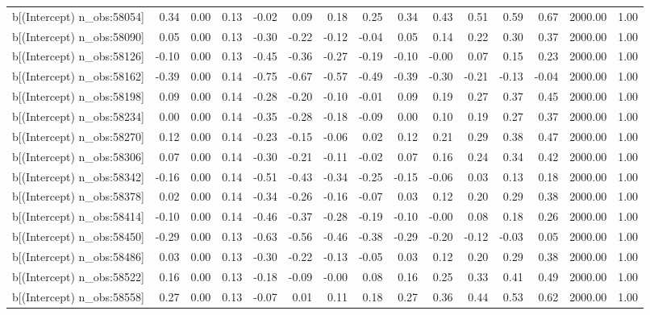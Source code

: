 \begin{table}[ht]
\begin{tabular}{rrrrrrrrrrrrrrr}
  b[(Intercept) n\_obs:58054] & 0.34 & 0.00 & 0.13 & -0.02 & 0.09 & 0.18 & 0.25 & 0.34 & 0.43 & 0.51 & 0.59 & 0.67 & 2000.00 & 1.00 \\ 
  b[(Intercept) n\_obs:58090] & 0.05 & 0.00 & 0.13 & -0.30 & -0.22 & -0.12 & -0.04 & 0.05 & 0.14 & 0.22 & 0.30 & 0.37 & 2000.00 & 1.00 \\ 
  b[(Intercept) n\_obs:58126] & -0.10 & 0.00 & 0.13 & -0.45 & -0.36 & -0.27 & -0.19 & -0.10 & -0.00 & 0.07 & 0.15 & 0.23 & 2000.00 & 1.00 \\ 
  b[(Intercept) n\_obs:58162] & -0.39 & 0.00 & 0.14 & -0.75 & -0.67 & -0.57 & -0.49 & -0.39 & -0.30 & -0.21 & -0.13 & -0.04 & 2000.00 & 1.00 \\ 
  b[(Intercept) n\_obs:58198] & 0.09 & 0.00 & 0.14 & -0.28 & -0.20 & -0.10 & -0.01 & 0.09 & 0.19 & 0.27 & 0.37 & 0.45 & 2000.00 & 1.00 \\ 
  b[(Intercept) n\_obs:58234] & 0.00 & 0.00 & 0.14 & -0.35 & -0.28 & -0.18 & -0.09 & 0.00 & 0.10 & 0.19 & 0.27 & 0.37 & 2000.00 & 1.00 \\ 
  b[(Intercept) n\_obs:58270] & 0.12 & 0.00 & 0.14 & -0.23 & -0.15 & -0.06 & 0.02 & 0.12 & 0.21 & 0.29 & 0.38 & 0.47 & 2000.00 & 1.00 \\ 
  b[(Intercept) n\_obs:58306] & 0.07 & 0.00 & 0.14 & -0.30 & -0.21 & -0.11 & -0.02 & 0.07 & 0.16 & 0.24 & 0.34 & 0.42 & 2000.00 & 1.00 \\ 
  b[(Intercept) n\_obs:58342] & -0.16 & 0.00 & 0.14 & -0.51 & -0.43 & -0.34 & -0.25 & -0.15 & -0.06 & 0.03 & 0.13 & 0.18 & 2000.00 & 1.00 \\ 
  b[(Intercept) n\_obs:58378] & 0.02 & 0.00 & 0.14 & -0.34 & -0.26 & -0.16 & -0.07 & 0.03 & 0.12 & 0.20 & 0.29 & 0.38 & 2000.00 & 1.00 \\ 
  b[(Intercept) n\_obs:58414] & -0.10 & 0.00 & 0.14 & -0.46 & -0.37 & -0.28 & -0.19 & -0.10 & -0.00 & 0.08 & 0.18 & 0.26 & 2000.00 & 1.00 \\ 
  b[(Intercept) n\_obs:58450] & -0.29 & 0.00 & 0.13 & -0.63 & -0.56 & -0.46 & -0.38 & -0.29 & -0.20 & -0.12 & -0.03 & 0.05 & 2000.00 & 1.00 \\ 
  b[(Intercept) n\_obs:58486] & 0.03 & 0.00 & 0.13 & -0.30 & -0.22 & -0.13 & -0.05 & 0.03 & 0.12 & 0.20 & 0.29 & 0.38 & 2000.00 & 1.00 \\ 
  b[(Intercept) n\_obs:58522] & 0.16 & 0.00 & 0.13 & -0.18 & -0.09 & -0.00 & 0.08 & 0.16 & 0.25 & 0.33 & 0.41 & 0.49 & 2000.00 & 1.00 \\ 
  b[(Intercept) n\_obs:58558] & 0.27 & 0.00 & 0.13 & -0.07 & 0.01 & 0.11 & 0.18 & 0.27 & 0.36 & 0.44 & 0.53 & 0.62 & 2000.00 & 1.00 \\ 

\end{tabular}
\end{table}
